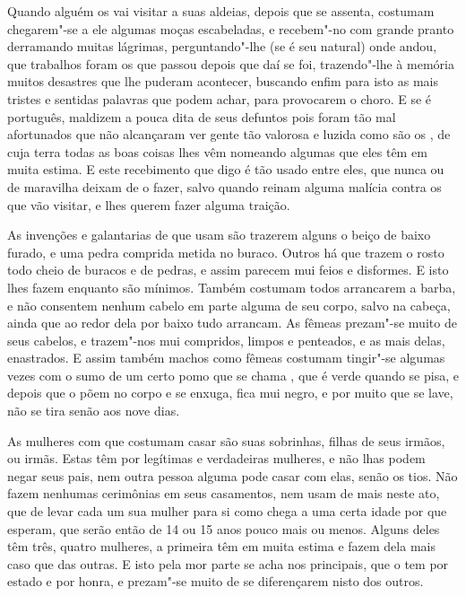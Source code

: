 Quando alguém os vai visitar a suas aldeias, depois que se assenta,			%
costumam chegarem"-se a ele algumas moças escabeladas, e recebem"-no com
grande pranto derramando muitas lágrimas, perguntando"-lhe (se é seu
natural) onde andou, que trabalhos foram os que passou depois que daí
se foi, trazendo"-lhe à memória muitos desastres que lhe puderam
acontecer, buscando enfim para isto as mais tristes e sentidas palavras
que podem achar, para provocarem o choro. E se é português, maldizem a			%
pouca dita de seus defuntos pois foram tão mal afortunados que não
alcançaram ver gente tão valorosa e luzida como são os , de
cuja terra todas as boas coisas lhes vêm nomeando algumas que eles têm
em muita estima. E este recebimento que digo é tão usado entre eles,
que nunca ou de maravilha deixam de o fazer, salvo quando
reinam alguma malícia contra os que vão visitar, e lhes querem
fazer alguma traição.

As invenções e galantarias de que usam são trazerem alguns o beiço			%
de baixo furado, e uma pedra comprida metida no buraco. Outros há que
trazem o rosto todo cheio de buracos e de pedras, e assim parecem mui
feios e disformes. E isto lhes fazem enquanto são mínimos. Também
costumam todos arrancarem a barba, e não consentem nenhum cabelo em
parte alguma de seu corpo, salvo na cabeça, ainda que ao redor dela por
baixo tudo arrancam. As fêmeas prezam"-se muito de seus cabelos, e
trazem"-nos mui compridos, limpos e penteados, e as mais delas, 
enastrados. E assim também machos como fêmeas costumam tingir"-se algumas
vezes com o sumo de um certo pomo que se chama , que é verde
quando se pisa, e depois que o põem no corpo e se enxuga, fica mui
negro, e por muito que se lave, não se tira senão aos nove dias. 

As mulheres com que costumam casar são suas sobrinhas, filhas de seus			%
irmãos, ou irmãs. Estas têm por legítimas e verdadeiras mulheres, e não
lhas podem negar seus pais, nem outra pessoa alguma pode casar com elas,
senão os tios. Não fazem nenhumas cerimônias em seus casamentos, nem
usam de mais neste ato, que de levar cada um sua mulher para si como			%
chega a uma certa idade por que esperam, que serão então de 14 ou			%
15 anos pouco mais ou menos. Alguns deles têm três, quatro mulheres,
a primeira têm em muita estima e fazem dela mais caso que das outras. E			%
isto pela mor parte se acha nos principais, que o tem por estado e por
honra, e prezam"-se muito de se diferençarem nisto dos outros.

